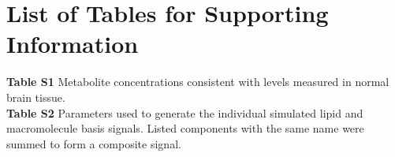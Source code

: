 \documentclass[num-refs]{wiley-article}
\begin{document}
\section*{List of Tables for Supporting Information}
\textbf{Table S1} Metabolite concentrations consistent with levels measured in normal brain tissue. \\
\textbf{Table S2} Parameters used to generate the individual simulated lipid and macromolecule basis signals. Listed components with the same name were summed to form a composite signal. \\
\end{document}
